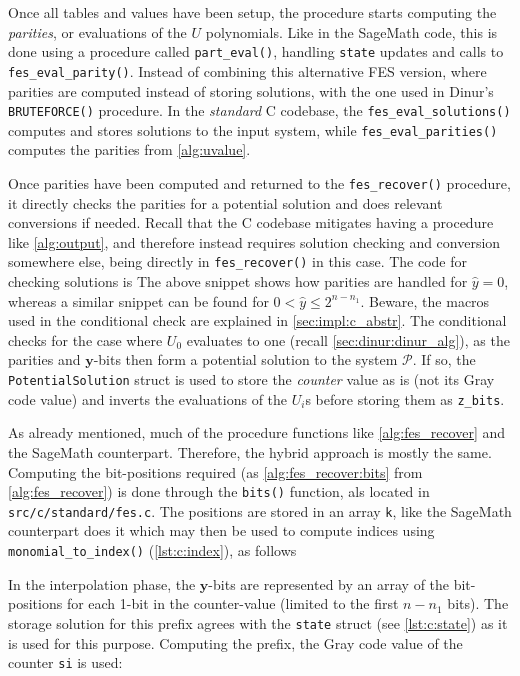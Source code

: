 Once all tables and values have been setup, the procedure starts computing the \textit{parities}, or evaluations of the $U$ polynomials. Like in the SageMath code, this is done using a procedure called \texttt{part\_eval()}, handling \texttt{state} updates and calls to \texttt{fes\_eval\_parity()}. Instead of combining this alternative FES version, where parities are computed instead of storing solutions, with the one used in Dinur's \texttt{BRUTEFORCE()} procedure. In the \textit{standard} C codebase, the \texttt{fes\_eval\_solutions()} computes and stores solutions to the input system, while \texttt{fes\_eval\_parities()} computes the parities from \cref{alg:uvalue}.

Once parities have been computed and returned to the \texttt{fes\_recover()} procedure, it directly checks the parities for a potential solution and does relevant conversions if needed. Recall that the C codebase mitigates having a procedure like \cref{alg:output}, and therefore instead requires solution checking and conversion somewhere else, being directly in \texttt{fes\_recover()} in this case. The code for checking solutions is 
The above snippet shows how parities are handled for $\hat{y} = 0$, whereas a similar snippet can be found for $0 < \hat{y} \leq 2^{n - n_1}$. Beware, the macros used in the conditional check are explained in \cref{sec:impl:c_abstr}. The conditional checks for the case where $U_0$ evaluates to one (recall \cref{sec:dinur:dinur_alg}), as the parities and $\mathbf{y}$-bits then form a potential solution to the system $\mathcal{P}$. If so, the \texttt{PotentialSolution} struct is used to store the \textit{counter} value as is (not its Gray code value) and inverts the evaluations of the $U_i$s before storing them as \texttt{z\_bits}.

As already mentioned, much of the procedure functions like \cref{alg:fes_recover} and the SageMath counterpart. Therefore, the hybrid approach is mostly the same. Computing the bit-positions required (as \cref{alg:fes_recover:bits} from \cref{alg:fes_recover}) is done through the \texttt{bits()} function, als located in \texttt{src/c/standard/fes.c}. The positions are stored in an array \texttt{k}, like the SageMath counterpart does it 
which may then be used to compute indices using \texttt{monomial\_to\_index()} (\cref{lst:c:index}), as follows

In the interpolation phase, the $\mathbf{y}$-bits are represented by an array of the bit-positions for each 1-bit in the counter-value (limited to the first $n - n_1$ bits). The storage solution for this prefix agrees with the \texttt{state} struct (see \cref{lst:c:state}) as it is used for this purpose. Computing the prefix, the Gray code value of the counter \texttt{si} is used:

